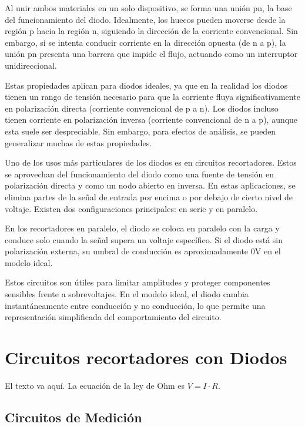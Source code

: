 \documentclass[journal]{IEEEtran}
\begin{document}
Al unir ambos materiales en un solo dispositivo, se forma una unión pn, la base del funcionamiento del diodo. Idealmente, los huecos pueden moverse desde la región p hacia la región n, siguiendo la dirección de la corriente convencional. Sin embargo, si se intenta conducir corriente en la dirección opuesta (de n a p), la unión pn presenta una barrera que impide el flujo, actuando como un interruptor unidireccional.

Estas propiedades aplican para diodos ideales, ya que en la realidad los diodos tienen un rango de tensión necesario para que la
corriente fluya significativamente en polarización directa (corriente convencional de p a n). Los diodos incluso tienen corriente en polarización inversa (corriente convencional de n a p), aunque esta suele ser despreciable. Sin embargo, para efectos de análisis, se pueden 
generalizar muchas de estas propiedades.

Uno de los usos más particulares de los diodos es en circuitos recortadores. Estos se aprovechan del funcionamiento del diodo como una fuente de tensión en polarización directa
y como un nodo abierto en inversa. En estas aplicaciones, se elimina partes de la señal de entrada por encima o por debajo de cierto nivel de voltaje. Existen dos configuraciones principales: en serie y en paralelo.  

En los recortadores en paralelo, el diodo se coloca en paralelo con la carga y conduce solo cuando la señal supera un voltaje específico. Si el diodo está sin polarización externa, su umbral de conducción es aproximadamente 0V en el modelo ideal.   

Estos circuitos son útiles para limitar amplitudes y proteger componentes sensibles frente a sobrevoltajes. En el modelo ideal, el diodo cambia instantáneamente entre conducción y no conducción, lo que permite una representación simplificada del comportamiento del circuito.\cite{Boylestad}


\section{Circuitos recortadores con Diodos}
El texto va aquí. La ecuación de la ley de Ohm es $V=I\cdot R$.


\subsection{Circuitos de Medición}
\end{document}

